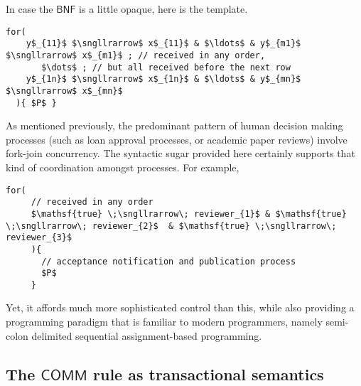 
In case the $\mathsf{BNF}$ is a little opaque, here is the template.

\begin{lstlisting}[mathescape=true]
  for(
    y$_{11}$ $\sngllrarrow$ x$_{11}$ & $\ldots$ & y$_{m1}$ $\sngllrarrow$ x$_{m1}$ ; // received in any order, 
       $\dots$ ; // but all received before the next row
    y$_{1n}$ $\sngllrarrow$ x$_{1n}$ & $\ldots$ & y$_{mn}$ $\sngllrarrow$ x$_{mn}$
  ){ $P$ }
\end{lstlisting}

As mentioned previously, the predominant pattern of human decision
making processes (such as loan approval processes, or academic paper
reviews) involve fork-join concurrency. The syntactic sugar provided
here certainly supports that kind of coordination amongst processes. For example,

\begin{lstlisting}[mathescape=true]
  for(
     // received in any order
     $\mathsf{true} \;\sngllrarrow\; reviewer_{1}$ & $\mathsf{true} \;\sngllrarrow\; reviewer_{2}$  & $\mathsf{true} \;\sngllrarrow\; reviewer_{3}$ 
     ){
       // acceptance notification and publication process
       $P$
     } 
\end{lstlisting}

Yet, it affords much more sophisticated control than this, while also
providing a programming paradigm that is familiar to modern
programmers, namely semi-colon delimited sequential assignment-based
programming.

\subsection{The $\mathsf{COMM}$ rule as transactional semantics}

